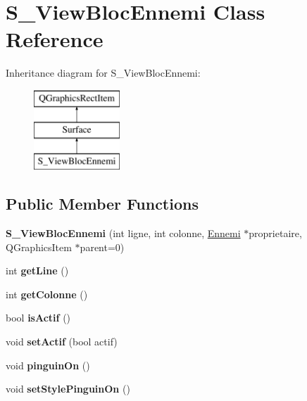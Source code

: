 \hypertarget{class_s___view_bloc_ennemi}{}\section{S\+\_\+\+View\+Bloc\+Ennemi Class Reference}
\label{class_s___view_bloc_ennemi}
Inheritance diagram for S\+\_\+\+View\+Bloc\+Ennemi\+:\begin{figure}[H]
\begin{center}
\leavevmode
\includegraphics[height=3.000000cm]{class_s___view_bloc_ennemi}
\end{center}
\end{figure}
\subsection*{Public Member Functions}
\begin{DoxyCompactItemize}
\item 
\hypertarget{class_s___view_bloc_ennemi_a61ac9969081699f9cc22f89dcfdba2e6}{}{\bfseries S\+\_\+\+View\+Bloc\+Ennemi} (int ligne, int colonne, \hyperlink{class_ennemi}{Ennemi} $\ast$proprietaire, Q\+Graphics\+Item $\ast$parent=0)\label{class_s___view_bloc_ennemi_a61ac9969081699f9cc22f89dcfdba2e6}

\item 
\hypertarget{class_s___view_bloc_ennemi_af570c3ab5ad404591829ef8bbed13b08}{}int {\bfseries get\+Line} ()\label{class_s___view_bloc_ennemi_af570c3ab5ad404591829ef8bbed13b08}

\item 
\hypertarget{class_s___view_bloc_ennemi_ae843182fc545b9c84c22322873e499cd}{}int {\bfseries get\+Colonne} ()\label{class_s___view_bloc_ennemi_ae843182fc545b9c84c22322873e499cd}

\item 
\hypertarget{class_s___view_bloc_ennemi_a5aef2bd784ad1c7c180de4f5608a9624}{}bool {\bfseries is\+Actif} ()\label{class_s___view_bloc_ennemi_a5aef2bd784ad1c7c180de4f5608a9624}

\item 
\hypertarget{class_s___view_bloc_ennemi_a976bc517403eeef48f2e7d8bb67dfa99}{}void {\bfseries set\+Actif} (bool actif)\label{class_s___view_bloc_ennemi_a976bc517403eeef48f2e7d8bb67dfa99}

\item 
\hypertarget{class_s___view_bloc_ennemi_a3c6bb606eaf348d513caf0bfd73fd0aa}{}void {\bfseries pinguin\+On} ()\label{class_s___view_bloc_ennemi_a3c6bb606eaf348d513caf0bfd73fd0aa}

\item 
\hypertarget{class_s___view_bloc_ennemi_a215944e297397346d3d5c0a08ae3d1fb}{}void {\bfseries set\+Style\+Pinguin\+On} ()\label{class_s___view_bloc_ennemi_a215944e297397346d3d5c0a08ae3d1fb}

\end{DoxyCompactItemize}
